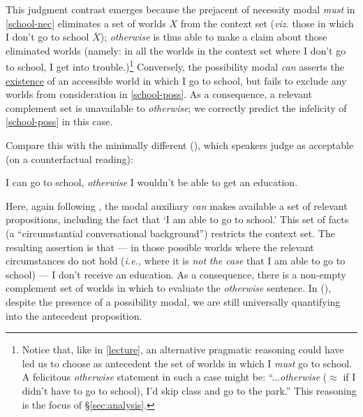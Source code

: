 This judgment contrast emerges because the prejacent of necessity modal \textit{must} in \ref{school-nec} eliminates a set of worlds $ X $ from the context set (\textit{viz.} those in which I don't go to school $ \overline{X} $); \textit{otherwise} is thus able to make a claim about those eliminated worlds (namely: in all the worlds in the context set where I don't go to school, I get into trouble.)\footnote{Notice that, like in \ref{lecture}, an alternative pragmatic reasoning could have led us to choose as antecedent the set of worlds in which I \textit{must} go to school. A felicitous \textit{otherwise} statement in such a case might be: ``...\textit{otherwise} ($ \approx $ if I didn't have to go to school), I'd skip class and go to the park.'' This reasoning is the focus of \S\ref{sec:analysis}.}
Conversely, the possibility modal \textit{can} asserts the \ul{existence} of an accessible world in which I go to school, but fails to exclude any worlds from consideration in \ref{school-poss}. As a consequence, a relevant complement set is unavailable to \textit{otherwise}; we correctly predict the infelicity of \ref{school-poss} in this case.

Compare this with the minimally different (\nextx), which speakers judge as acceptable (on a counterfactual reading):  

\pex  I can go to school, \textit{otherwise} I wouldn't be able to get an education.\xe%

Here, again following \citet{Kratzer1981}, the modal auxiliary \textit{can} makes available a set of relevant propositions, including the fact that `I am able to go to school.' This set of facts (a ``circumstantial conversational background'') restricts the context set.
The resulting assertion is that --- in those possible worlds where the relevant circumstances do not hold (\textit{i.e.,} where it is\textit{ not the case} that I am able to go to school) --- I don't receive an education. As a consequence, there is a non-empty complement set of worlds in which to evaluate the \textit{otherwise} sentence. In (\lastx), despite the presence of a possibility modal, we are still universally quantifying into the antecedent proposition. 

